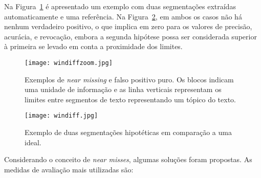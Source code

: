 Na Figura~\ref{fig:exemplosegmentacaozoom} é apresentado um exemplo com duas segmentações extraídas automaticamente e uma referência. Na Figura~\ref{fig:exemplosegmentacao}, em ambos os casos não há nenhum verdadeiro positivo, o que implica em zero para os valores de precisão, acurácia, e revocação, embora a segunda hipótese possa ser considerada superior à primeira se levado em conta a proximidade dos limites.



  \begin{figure}[!h]

	\centering
	\texttt{[image: windiffzoom.jpg]}
	\caption{Exemplos de \textit{near missing} e falso positivo puro. Os blocos indicam uma unidade de informação e as linha verticais representam os limites entre segmentos de texto representando um tópico do texto. }
	\label{fig:exemplosegmentacaozoom}

  \end{figure}
  
  \begin{figure}[!h]

	\centering
	\texttt{[image: windiff.jpg]}
	\caption{
	Exemplo de duas segmentações hipotéticas em comparação a uma ideal. 
	}
	\label{fig:exemplosegmentacao}

  \end{figure}
  

Considerando o conceito de \textit{near misses}, algumas soluções foram propostas. As medidas de avaliação mais utilizadas são:

